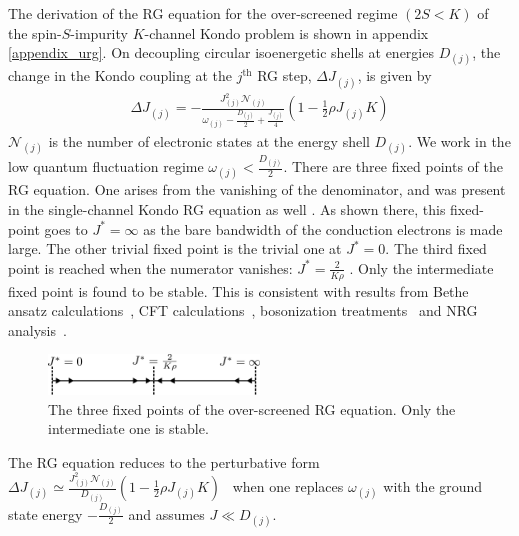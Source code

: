 \documentclass[reprint,prb,superscriptaddress]{revtex4-2}
\begin{document}
The derivation of the RG equation for the over-screened regime \((2S < K)\) of the spin-\(S\)-impurity \(K\)-channel Kondo problem is shown in appendix \ref{appendix_urg}. On decoupling circular isoenergetic shells at energies \(D_{(j)}\), the change in the Kondo coupling at the \(j^\text{th}\) RG step, \(\Delta J_{(j)}\), is given by
\begin{equation}\begin{aligned}
	\Delta J_{(j)} = -\frac{J_{(j)}^2 \mathcal{N}_{(j)}}{\omega_{(j)} - \frac{D_{(j)}}{2} + \frac{J_{(j)}}{4}}\left( 1 - \frac{1}{2}\rho J_{(j)} K \right) 
\end{aligned}\end{equation}
\(\mathcal{N}_{(j)}\) is the number of electronic states at the energy shell \(D_{(j)}\). We work in the low quantum fluctuation regime \(\omega_{(j)} < \frac{D_{(j)}}{2}\). There are three fixed points of the RG equation. One arises from the vanishing of the denominator, and was present in the single-channel Kondo RG equation as well \cite{kondo_urg}. As shown there, this fixed-point goes to \(J^* = \infty\) as the bare bandwidth of the conduction electrons is made large. The other trivial fixed point is the trivial one at \(J^* = 0\). The third fixed point is reached when the numerator vanishes: \(J^* = \frac{2}{K \rho}\) \cite{Gan_mchannel_1994,Kogan_2018,Kuramoto1998,Noz_blandin_1980}. Only the intermediate fixed point is found to be stable. This is consistent with results from Bethe ansatz calculations~\cite{Tsvelick_Weigmann_mchannel_1984,andrei_destri_1984,zarand_costi_2002,andrei_jerez_1995,Tsvelick_1985,Tsvelick1984}, CFT calculations~\cite{affleck_1991_overscreen,affleck1993exact,affleck_ludwig_1991}, bosonization treatments~\cite{emery_kivelson,vondelft_prl_1998} and NRG analysis~\cite{pang_cox_1991,mitchell_bulla_2014}.
\begin{figure}[!htpb]
	\centering
	\includegraphics[width=0.5\textwidth]{./rg_flow.pdf}
	\caption{The three fixed points of the over-screened RG equation. Only the intermediate one is stable.}
	\label{rg_flow}
\end{figure}

The RG equation reduces to the perturbative form \(\Delta J_{(j)} \simeq \frac{J_{(j)}^2 \mathcal{N}_{(j)}}{D_{(j)}}\left( 1 - \frac{1}{2}\rho J_{(j)} K \right)\)~\cite{Kogan_2018,Kuramoto1998,Noz_blandin_1980,tripathi2018landau} when one replaces \(\omega_{(j)}\) with the ground state energy \(-\frac{D_{(j)}}{2}\) and assumes \(J \ll D_{(j)}\).
\end{document}
